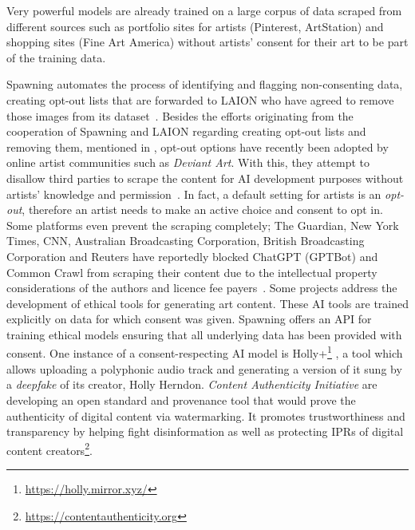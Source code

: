 \documentclass[conference]{IEEEtran}
\begin{document}
Very powerful models are already trained on a large corpus of data scraped from different sources such as portfolio sites for artists (Pinterest, ArtStation) and shopping sites (Fine Art America) without artists' consent for their art to be part of the training data.

Spawning automates the process of identifying and flagging non-consenting data, creating opt-out lists that are forwarded to LAION who have agreed to remove those images from its dataset~\cite{wu_how_2023}.
Besides the efforts originating from the cooperation of Spawning and LAION regarding creating opt-out lists and removing them, mentioned in , opt-out options have recently been adopted by online artist communities such as \textit{Deviant Art}. With this, they attempt to disallow third parties to scrape the content for AI development purposes without artists' knowledge and permission~\cite{wiggers_deviantart_2022}. In fact, a default setting for artists is an \textit{opt-out}, therefore an artist needs to make an active choice and consent to opt in. 
Some platforms even prevent the scraping completely; The Guardian, New York Times, CNN, Australian Broadcasting Corporation, British Broadcasting Corporation and Reuters have reportedly blocked ChatGPT (GPTBot) and Common Crawl from scraping their content due to the intellectual property considerations of the authors and licence fee payers~\cite{bogle_new_2023,marcus_generative_2024}.
Some projects address the development of ethical tools for generating art content. 
These AI tools are trained explicitly on data for which consent was given.
Spawning offers an API for training ethical models ensuring that all underlying data has been provided with consent.
One instance of a consent-respecting AI model is Holly+\footnote{\href{https://holly.mirror.xyz/54ds2IiOnvthjGFkokFCoaI4EabytH9xjAYy1irHy94}{https://holly.mirror.xyz/}}%
, a tool which allows uploading a polyphonic audio track and generating a version of it sung by a \textit{deepfake} of its creator, Holly Herndon.
\textit{Content Authenticity Initiative} are developing an open standard and provenance tool that would prove the authenticity of digital content via watermarking. 
It promotes trustworthiness and transparency by helping fight disinformation as well as protecting IPRs of digital content creators\footnote{\url{https://contentauthenticity.org}}.%
\end{document}
